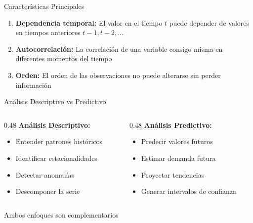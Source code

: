 \documentclass{beamer}
\begin{document}
\begin{frame}{Características Principales}
    \begin{enumerate}
        \item \textbf{Dependencia temporal:} El valor en el tiempo $t$ puede depender de valores en tiempos anteriores $t-1, t-2, \ldots$
        
        \vspace{0.3cm}
        
        \item \textbf{Autocorrelación:} La correlación de una variable consigo misma en diferentes momentos del tiempo
        
        \vspace{0.3cm}
        
        \item \textbf{Orden:} El orden de las observaciones no puede alterarse sin perder información
    \end{enumerate}
\end{frame}

\begin{frame}{Análisis Descriptivo vs Predictivo}
    \begin{columns}
        \begin{column}{0.48\textwidth}
            \textbf{Análisis Descriptivo:}
            \begin{itemize}
                \item Entender patrones históricos
                \item Identificar estacionalidades
                \item Detectar anomalías
                \item Descomponer la serie
            \end{itemize}
        \end{column}
        \begin{column}{0.48\textwidth}
            \textbf{Análisis Predictivo:}
            \begin{itemize}
                \item Predecir valores futuros
                \item Estimar demanda futura
                \item Proyectar tendencias
                \item Generar intervalos de confianza
            \end{itemize}
        \end{column}
    \end{columns}
    
    \vspace{0.5cm}
    
    \begin{center}
        Ambos enfoques son complementarios
    \end{center}
\end{frame}
\end{document}
